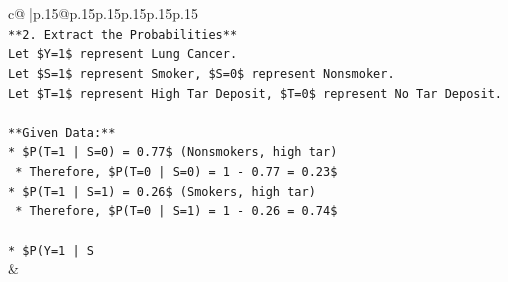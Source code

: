 \documentclass{article}
\begin{document}
{\begin{supertabular}{c@{$\;$}|p{.15\linewidth}@{}p{.15\linewidth}p{.15\linewidth}p{.15\linewidth}p{.15\linewidth}p{.15\linewidth}}
{{{\\ 
\texttt{**2. Extract the Probabilities**} \\
\texttt{Let \$Y=1\$ represent Lung Cancer.} \\
\texttt{Let \$S=1\$ represent Smoker, \$S=0\$ represent Nonsmoker.} \\
\texttt{Let \$T=1\$ represent High Tar Deposit, \$T=0\$ represent No Tar Deposit.} \\
\\ 
\texttt{**Given Data:**} \\
\texttt{*   \$P(T=1 | S=0) = 0.77\$ (Nonsmokers, high tar)} \\
\texttt{    *   Therefore, \$P(T=0 | S=0) = 1 {-} 0.77 = 0.23\$} \\
\texttt{*   \$P(T=1 | S=1) = 0.26\$ (Smokers, high tar)} \\
\texttt{    *   Therefore, \$P(T=0 | S=1) = 1 {-} 0.26 = 0.74\$} \\
\\ 
\texttt{*   \$P(Y=1 | S} \\
            }
        }
    }
    & \\ \\


\end{supertabular}}
\end{document}
